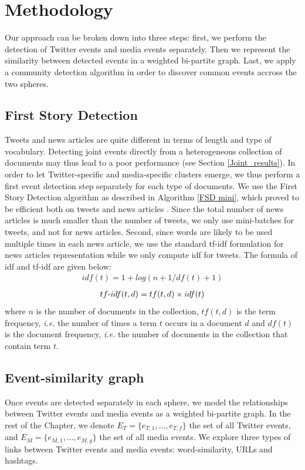 \section{Methodology}
Our approach can be broken down into three steps: first, we perform the detection of Twitter events and media events separately. Then we represent the similarity between detected events in a weighted bi-partite graph. Last, we apply a community detection algorithm in order to discover common events accross the two spheres.

\subsection{First Story Detection}
Tweets and news articles are quite different in terms of length and type of vocabulary. Detecting joint events directly from a heterogeneous collection of documents may thus lead to a poor performance (see Section \ref{Joint_results}). In order to let Twitter-specific and media-specific clusters emerge, we thus perform a first event detection step separately for each type of documents. We use the First Story Detection algorithm as described in Algorithm \ref{FSD mini}, which proved to be efficient both on tweets \citep{mazoyer2020french} and news articles \citep{cage2020production}. Since the total number of news articles is much smaller than the number of tweets, we only use mini-batches for tweets, and not for news articles. Second, since words are likely to be used multiple times in each news article, we use the standard tf-idf formulation for news articles representation while we only compute idf for tweets. The formula of idf and tf-idf are given below:
\begin{align}
idf(t) = 1 + log(n+1/df(t)+1)
\end{align}
\begin{align}
tf{\text -}idf(t, d) = tf(t, d) \times idf(t)
\end{align}
where $n$ is the number of documents in the collection, $tf(t, d)$ is the term frequency, \textit{i.e.} the number of times a term $t$ occurs in a document $d$ and $df(t)$ is the document frequency, \textit{i.e.} the number of documents in the collection that contain term $t$.

\subsection{Event-similarity graph}
Once events are detected separately in each sphere, we model the relationships between Twitter events and media events as a weighted bi-partite graph. In the rest of the Chapter, we denote $E_T = \{e_{T,1},\ldots,e_{T,f}\}$ the set of all Twitter events, and $E_M = \{e_{M,1},\ldots,e_{M,g}\}$ the set of all media events. We explore three types of links between Twitter events and media events: word-similarity, URLs and hashtags. 
